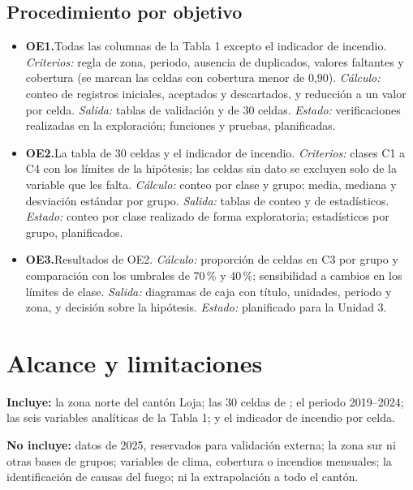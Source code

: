 \documentclass[11pt,a4paper]{article}
\newcommand{\var}[1]{\texttt{\StrSubstitute{#1}{_}{\_\allowbreak}}}
\begin{document}
\subsection{Procedimiento por objetivo}

\begin{itemize}
  \item \textbf{OE1.}Todas las columnas de la Tabla 1 excepto el indicador de incendio. \emph{Criterios:} regla de zona, periodo, ausencia de duplicados, valores faltantes y cobertura (se marcan las celdas con cobertura menor de 0,90). \emph{Cálculo:} conteo de registros iniciales, aceptados y descartados, y reducción a un valor por celda. \emph{Salida:} tablas de validación y de 30 celdas. \emph{Estado:} verificaciones realizadas en la exploración; funciones y pruebas, planificadas.
  \item \textbf{OE2.}La tabla de 30 celdas y el indicador de incendio. \emph{Criterios:} clases C1 a C4 con los límites de la hipótesis; las celdas sin dato se excluyen solo de la variable que les falta. \emph{Cálculo:} conteo por clase y grupo; media, mediana y desviación estándar por grupo. \emph{Salida:} tablas de conteo y de estadísticos. \emph{Estado:} conteo por clase realizado de forma exploratoria; estadísticos por grupo, planificados.
  \item \textbf{OE3.}Resultados de OE2. \emph{Cálculo:} proporción de celdas en C3 por grupo y comparación con los umbrales de 70\,\% y 40\,\%; sensibilidad a cambios en los límites de clase. \emph{Salida:} diagramas de caja con título, unidades, periodo y zona, y decisión sobre la hipótesis. \emph{Estado:} planificado para la Unidad 3.
\end{itemize}

\section{Alcance y limitaciones}
\textbf{Incluye:} la zona norte del cantón Loja; las 30 celdas de \var{equipo_01_relieve_norte.csv}; el periodo 2019--2024; las seis variables analíticas de la Tabla 1; y el indicador de incendio por celda.

\textbf{No incluye:} datos de 2025, reservados para validación externa; la zona sur ni otras bases de grupos; variables de clima, cobertura o incendios mensuales; la identificación de causas del fuego; ni la extrapolación a todo el cantón.
\end{document}

